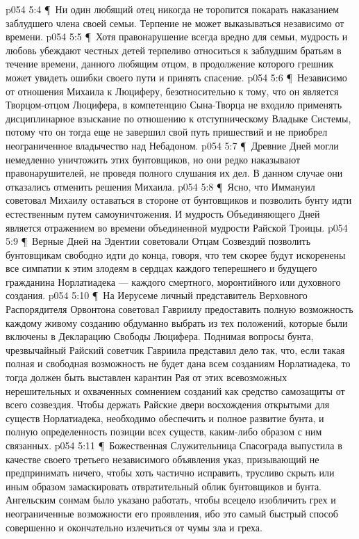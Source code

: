\vs p054 5:4 \P\ \bibnobreakspace Ни один любящий отец никогда не торопится покарать наказанием заблудшего члена своей семьи. Терпение не может выказываться независимо от времени.
\vs p054 5:5 \P\ \bibnobreakspace Хотя правонарушение всегда вредно для семьи, мудрость и любовь убеждают честных детей терпеливо относиться к заблудшим братьям в течение времени, данного любящим отцом, в продолжение которого грешник может увидеть ошибки своего пути и принять спасение.
\vs p054 5:6 \P\ \bibnobreakspace Независимо от отношения Михаила к Люциферу, безотносительно к тому, что он является Творцом\hyp{}отцом Люцифера, в компетенцию Сына\hyp{}Творца не входило применять дисциплинарное взыскание по отношению к отступническому Владыке Системы, потому что он тогда еще не завершил свой путь пришествий и не приобрел неограниченное владычество над Небадоном.
\vs p054 5:7 \P\ \bibnobreakspace Древние Дней могли немедленно уничтожить этих бунтовщиков, но они редко наказывают правонарушителей, не проведя полного слушания их дел. В данном случае они отказались отменить решения Михаила.
\vs p054 5:8 \P\ \bibnobreakspace Ясно, что Иммануил советовал Михаилу оставаться в стороне от бунтовщиков и позволить бунту идти естественным путем самоуничтожения. И мудрость Объединяющего Дней является отражением во времени объединенной мудрости Райской Троицы.
\vs p054 5:9 \P\ \bibnobreakspace Верные Дней на Эдентии советовали Отцам Созвездий позволить бунтовщикам свободно идти до конца, говоря, что тем скорее будут искоренены все симпатии к этим злодеям в сердцах каждого теперешнего и будущего гражданина Норлатиадека --- каждого смертного, моронтийного или духовного создания.
\vs p054 5:10 \P\ \bibnobreakspace На Иерусеме личный представитель Верховного Распорядителя Орвонтона советовал Гавриилу предоставить полную возможность каждому живому созданию обдуманно выбрать из тех положений, которые были включены в Декларацию Свободы Люцифера. Поднимая вопросы бунта, чрезвычайный Райский советчик Гавриила представил дело так, что, если такая полная и свободная возможность не будет дана всем созданиям Норлатиадека, то тогда должен быть выставлен карантин Рая от этих всевозможных нерешительных и охваченных сомнением созданий как средство самозащиты от всего созвездия. Чтобы держать Райские двери восхождения открытыми для существ Норлатиадека, необходимо обеспечить и полное развитие бунта, и полную определенность позиции всех существ, каким\hyp{}либо образом с ним связанных.
\vs p054 5:11 \P\ \bibnobreakspace Божественная Служительница Спасограда выпустила в качестве своего третьего независимого объявления указ, призывающий не предпринимать ничего, чтобы хоть частично исправить, трусливо скрыть или иным образом замаскировать отвратительный облик бунтовщиков и бунта. Ангельским сонмам было указано работать, чтобы всецело изобличить грех и неограниченные возможности его проявления, ибо это самый быстрый способ совершенно и окончательно излечиться от чумы зла и греха.
